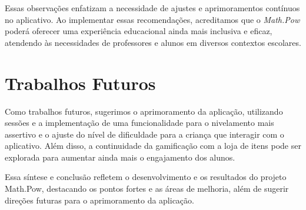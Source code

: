 Essas observações enfatizam a necessidade de ajustes e aprimoramentos contínuos no aplicativo. Ao implementar essas recomendações, acreditamos que o \textit{Math.Pow} poderá oferecer uma experiência educacional ainda mais inclusiva e eficaz, atendendo às necessidades de professores e alunos em diversos contextos escolares.

\section{Trabalhos Futuros}

Como trabalhos futuros, sugerimos o aprimoramento da aplicação, utilizando sessões e a implementação de uma funcionalidade para o nivelamento mais assertivo e o ajuste do nível de dificuldade para a criança que interagir com o aplicativo. Além disso, a continuidade da gamificação com a loja de itens pode ser explorada para aumentar ainda mais o engajamento dos alunos.


Essa síntese e conclusão refletem o desenvolvimento e os resultados do projeto Math.Pow, destacando os pontos fortes e as áreas de melhoria, além de sugerir direções futuras para o aprimoramento da aplicação.